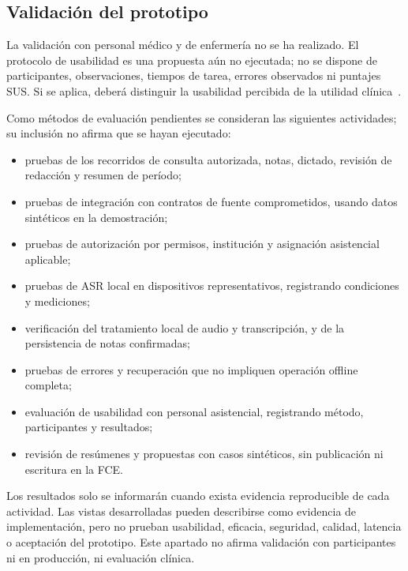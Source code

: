\subsection{Validación del prototipo}

La validación con personal médico y de enfermería no se ha realizado. El protocolo de usabilidad es una propuesta aún no ejecutada; no se dispone de participantes, observaciones, tiempos de tarea, errores observados ni puntajes SUS. Si se aplica, deberá distinguir la usabilidad percibida de la utilidad clínica~\cite{ref_brooke_sus}.

Como métodos de evaluación pendientes se consideran las siguientes actividades; su inclusión no afirma que se hayan ejecutado:

\begin{itemize}
    \item pruebas de los recorridos de consulta autorizada, notas, dictado, revisión de redacción y resumen de período;
    \item pruebas de integración con contratos de fuente comprometidos, usando datos sintéticos en la demostración;
    \item pruebas de autorización por permisos, institución y asignación asistencial aplicable;
    \item pruebas de ASR local en dispositivos representativos, registrando condiciones y mediciones;
    \item verificación del tratamiento local de audio y transcripción, y de la persistencia de notas confirmadas;
    \item pruebas de errores y recuperación que no impliquen operación offline completa;
    \item evaluación de usabilidad con personal asistencial, registrando método, participantes y resultados;
    \item revisión de resúmenes y propuestas con casos sintéticos, sin publicación ni escritura en la FCE.
\end{itemize}

Los resultados solo se informarán cuando exista evidencia reproducible de cada actividad. Las vistas desarrolladas pueden describirse como evidencia de implementación, pero no prueban usabilidad, eficacia, seguridad, calidad, latencia o aceptación del prototipo. Este apartado no afirma validación con participantes ni en producción, ni evaluación clínica.
